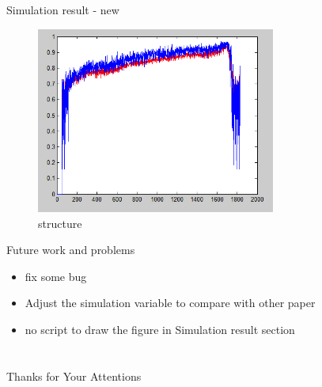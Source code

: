 \documentclass{beamer}
\begin{document}
\begin{frame}{Simulation result - new}
    \begin{figure}[t]
        \centering
        \includegraphics[width=0.7\textwidth]{figures/new.png}
        \caption{structure}
    \end{figure}
\end{frame}

\begin{frame}{Future work and problems}
    \begin{itemize}
        \item {fix some bug}
        \item {Adjust the simulation variable to compare with other paper}
        \item {no script to draw the figure in Simulation result section}
    \end{itemize}
\end{frame}


\section{}

\begin{frame}
    \centering
    \Large{Thanks for Your Attentions}
\end{frame}
\end{document}
